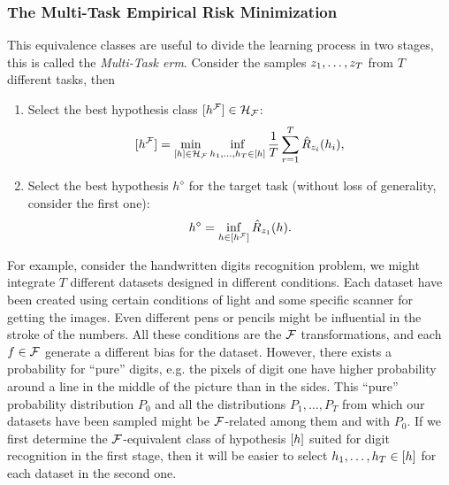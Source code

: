 \subsubsection*{The Multi-Task Empirical Risk Minimization}
This equivalence classes are useful to divide the learning process in two stages, this is called the \emph{Multi-Task \acrshort{erm}}. Consider the samples $z_1, \ldots, z_T$ from $T$ different tasks, then
\begin{enumerate}
    \item Select the best hypothesis class $\lbrack h^{\mathcal{F}}\rbrack \in \mathcal{H}_{\mathcal{F}}$:
    \begin{equation}
        \nonumber
        \lbrack h^{\mathcal{F}}\rbrack = \min_{\lbrack h\rbrack \in \mathcal{H}_{\mathcal{F}}} \inf_{h_1, \ldots, h_T \in \lbrack h\rbrack} \frac{1}{T} \sum_{r=1}^T \hat{R}_{z_i}(h_i) ,
    \end{equation}
    \item Select the best hypothesis $h^\diamond$ for the target task (without loss of generality, consider the first one):
    \begin{equation}
        \nonumber
        h^\diamond = \inf_{h \in \lbrack h^{\mathcal{F}}\rbrack} \hat{R}_{z_1}(h) .
    \end{equation}
\end{enumerate}

For example, consider the handwritten digits recognition problem, we might integrate $T$ different datasets designed in different conditions. Each dataset have been created using certain conditions of light and some specific scanner for getting the images. Even different pens or pencils might be influential in the stroke of the numbers. All these conditions are the $\mathcal{F}$ transformations, and each $f \in \mathcal{F}$ generate a different bias for the dataset. However, there exists a probability for ``pure'' digits, e.g. the pixels of digit one have higher probability around a line in the middle of the picture than in the sides. This ``pure'' probability distribution $P_0$ and all the distributions $P_1, \ldots, P_T$ from which our datasets have been sampled might be $\mathcal{F}$-related among them and with $P_0$. If we first determine the $\mathcal{F}$-equivalent class of hypothesis $\lbrack h\rbrack$ suited for digit recognition in the first stage, then it will be easier to select $h_1, \ldots, h_T \in \lbrack h\rbrack$ for each dataset in the second one.

